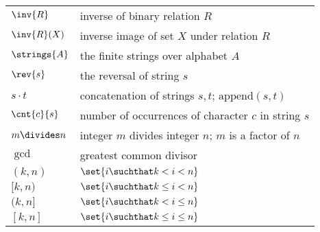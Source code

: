 \begin{center}
\begin{tabular}{ll}
$\inv{R}$      & inverse of binary relation $R$\\
$\inv{R}(X)$   & inverse image of set $X$ under relation $R$\\
$\strings{A}$  & the finite strings over alphabet $A$\\
$\rev{s}$      & the reversal of string $s$\\
$s \cdot t$    & concatenation of strings $s,t$; $\text{append}(s,t)$\\
$\cnt{c}{s}$   & number of occurrences of character $c$ in string $s$\\
$m \divides n$ & integer $m$ divides integer $n$; $m$ is a factor of $n$\\
$\gcd{}{}$     & greatest common divisor\\
$(k, n)$       & $\set{i \suchthat k < i < n}$\\
$[k, n)$       & $\set{i \suchthat k \le i < n}$\\
$(k, n]$       & $\set{i \suchthat k < i \le n}$\\
$[k,n]$        & $\set{i \suchthat k \le i \le n}$

\end{tabular}
\end{center}
